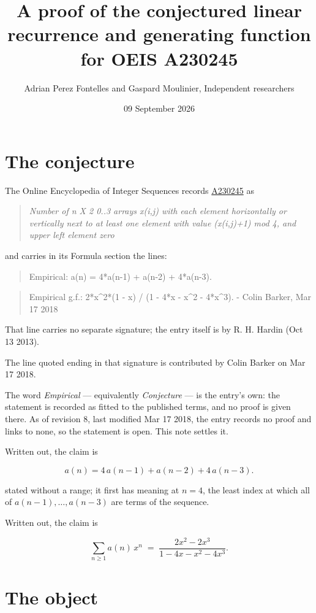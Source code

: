 \documentclass[11pt]{article}
\title{A proof of the conjectured linear recurrence and generating function for OEIS A230245}
\author{Adrian Perez Fontelles and Gaspard Moulinier, Independent researchers}
\date{09 September 2026}
\theoremstyle{definition}
\begin{document}
\maketitle
\section{The conjecture}

The Online Encyclopedia of Integer Sequences records \href{https://oeis.org/A230245}{A230245} as

\begin{quote}\itshape Number of n X 2 0..3 arrays x(i,j) with each element horizontally or vertically next to at least one element with value (x(i,j)+1) mod 4, and upper left element zero\end{quote}

and carries in its Formula section the lines:

\begin{quote}\ttfamily Empirical: a(n) = 4*a(n-1) + a(n-2) + 4*a(n-3).\end{quote}

\begin{quote}\ttfamily Empirical g.f.: 2*x\textasciicircum{}2*(1 - x) / (1 - 4*x - x\textasciicircum{}2 - 4*x\textasciicircum{}3). - Colin Barker, Mar 17 2018\end{quote}

That line carries no separate signature; the entry itself is by R. H. Hardin (Oct 13 2013).

The line quoted ending in that signature is contributed by Colin Barker on Mar 17 2018.

The word {\itshape Empirical} --- equivalently {\itshape Conjecture} --- is the entry's own: the statement is recorded as fitted to the published terms, and no proof is given there. As of revision 8, last modified Mar 17 2018, the entry records no proof and links to none, so the statement is open. This note settles it.

Written out, the claim is

\[a(n) = 4\,a(n-1) + a(n-2) + 4\,a(n-3).\]

stated without a range; it first has meaning at $n = 4$, the least index at which all of $a(n-1),\dots,a(n-3)$ are terms of the sequence.

Written out, the claim is

\[\sum_{n \ge 1} a(n)\,x^n \;=\; \frac{2x^{2} - 2x^{3}}{1 - 4x - x^{2} - 4x^{3}}.\]

\section{The object}
\end{document}
